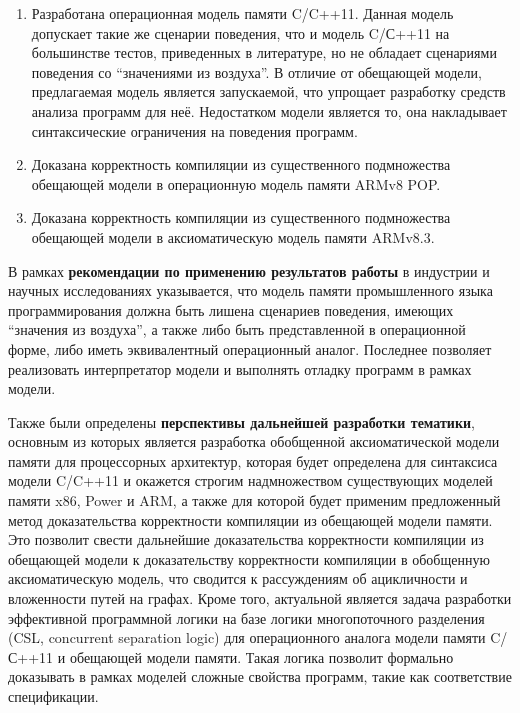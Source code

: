 \begin{enumerate}
  \item Разработана операционная модель памяти C/C++11.
    Данная модель допускает такие же сценарии поведения, что и модель C/С++11 на большинстве
    тестов, приведенных в литературе, но не обладает сценариями поведения со ``значениями из воздуха''.
    В отличие от обещающей модели, предлагаемая модель является запускаемой, что упрощает
    разработку средств анализа программ для неё. Недостатком модели является то,
    она накладывает синтаксические ограничения на поведения программ.
  \item Доказана корректность компиляции из существенного подмножества обещающей модели в операционную модель
    памяти ARMv8 POP.
  \item Доказана корректность компиляции из существенного подмножества обещающей модели в
    аксиоматическую модель памяти ARMv8.3.
\end{enumerate}

В рамках \textbf{рекомендации по применению результатов работы} в индустрии и научных исследованиях указывается,
что модель памяти промышленного языка программирования должна быть лишена сценариев поведения, имеющих ``значения из воздуха'',
а также либо быть представленной в операционной форме, либо иметь эквивалентный операционный аналог.
Последнее позволяет реализовать интерпретатор модели и выполнять отладку программ в рамках модели.

Также были определены \textbf{перспективы дальнейшей разработки тематики}, основным из которых является
разработка обобщенной аксиоматической модели памяти для процессорных архитектур, которая будет
определена для синтаксиса модели C/C++11 и окажется строгим надмножеством существующих моделей памяти
x86, Power и ARM, а также для которой будет применим предложенный метод доказательства корректности компиляции
из обещающей модели памяти. Это позволит свести дальнейшие доказательства корректности компиляции из
обещающей модели к доказательству корректности компиляции в обобщенную аксиоматическую модель, что
сводится к рассуждениям об ацикличности и вложенности путей на графах.
Кроме того, актуальной является задача разработки эффективной программной логики на базе логики многопоточного разделения
(CSL, concurrent separation logic) для операционного аналога модели памяти C/С++11 и обещающей модели памяти.
Такая логика позволит формально доказывать  в рамках моделей сложные свойства программ, такие как соответствие спецификации.

